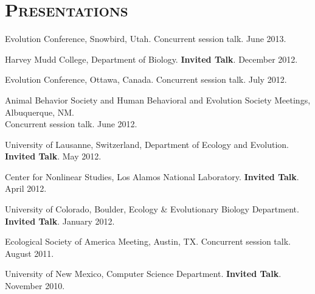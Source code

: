 \documentclass[centered,overlapped,line]{res}
\begin{document}
\begin{resume}
  { \setlength{\parskip}{1.25ex}
  }



  \pagestyle{fancy}
  \section{\bf \large \scshape  Presentations}
  \setlength{\parskip}{1.5ex plus 1ex minus .2ex}
  \vspace{1ex}

  Evolution Conference, Snowbird, Utah. Concurrent session talk. June 2013.

  Harvey Mudd College, Department of Biology.  \textbf{Invited Talk}. December 2012.

  Evolution Conference, Ottawa, Canada. Concurrent session talk. July 2012.

  Animal Behavior Society and Human Behavioral and Evolution Society Meetings, Albuquerque, NM.  \\
  Concurrent session talk.  June 2012.

  University of Lausanne, Switzerland, Department of Ecology and Evolution. \textbf{Invited Talk}. May 2012.

  Center for Nonlinear Studies, Los Alamos National Laboratory. \textbf{Invited Talk}. April 2012.

  University of Colorado, Boulder, Ecology \& Evolutionary Biology Department. \textbf{Invited Talk}. January 2012.

  Ecological Society of America Meeting, Austin, TX. Concurrent session talk. August 2011.

  University of New Mexico, Computer Science Department.  \textbf{Invited Talk}. November 2010.


\end{resume}
\end{document}
